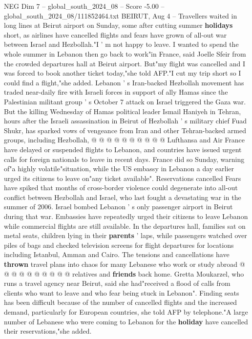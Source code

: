 \begin{textsample}{NEG Dim 7 – global\_south\_2024\_08 – Score -5.00 – global\_south\_2024\_08/111852464.txt}  \label{ex:f7_neg_371}
BEIRUT, Aug 4 -- Travellers waited in long lines at Beirut airport on Sunday, some after cutting summer \textbf{holidays} short, as airlines have cancelled flights and fears have grown of all-out war between Israel and Hezbollah."I ' m not happy to leave.
I wanted to spend the whole summer in Lebanon then go back to work"in France, said Joelle Sfeir from the crowded departures hall at Beirut airport.
But"my flight was cancelled and I was forced to book another ticket today,"she told AFP."I cut my trip short so I could find a flight,"she added.
Lebanon ' s Iran-backed Hezbollah movement has traded near-daily fire with Israeli forces in support of ally Hamas since the Palestinian militant group ' s October 7 attack on Israel triggered the Gaza war.
But the killing Wednesday of Hamas political leader Ismail Haniyeh in Tehran, hours after the Israeli assassination in Beirut of Hezbollah ' s military chief Fuad Shukr, has sparked vows of vengeance from Iran and other Tehran-backed armed groups, including Hezbollah, @ @ @ @ @ @ @ @ @ @ Lufthansa and Air France have delayed or suspended flights to Lebanon, and countries have issued urgent calls for foreign nationals to leave in recent days.
France did so Sunday, warning of"a highly volatile"situation, while the US embassy in Lebanon a day earlier urged its citizens to leave on"any ticket available".
Reservations cancelled Fears have spiked that months of cross-border violence could degenerate into all-out conflict between Hezbollah and Israel, who last fought a devastating war in the summer of 2006.
Israel bombed Lebanon ' s only passenger airport in Beirut during that war.
Embassies have repeatedly urged their citizens to leave Lebanon while commercial flights are still available.
In the departures hall, families sat on metal seats, children lying in their \textbf{parents} ' laps, while passengers watched over piles of bags and checked television screens for flight departures for locations including Istanbul, Amman and Cairo.
The tensions and cancellations have \textbf{thrown} travel plans into chaos for many Lebanese who work or study abroad @ @ @ @ @ @ @ @ @ @ relatives and \textbf{friends} back home.
Gretta Moukarzel, who runs a travel agency near Beirut, said she had"received a flood of calls from clients who want to leave and who fear being stuck in Lebanon".
Finding seats has been difficult because of the number of cancelled flights and the increased demand, particularly for European countries, she told AFP by telephone."A large number of Lebanese who were coming to Lebanon for the \textbf{holiday} have cancelled their reservations,"she added.

\end{textsample}
